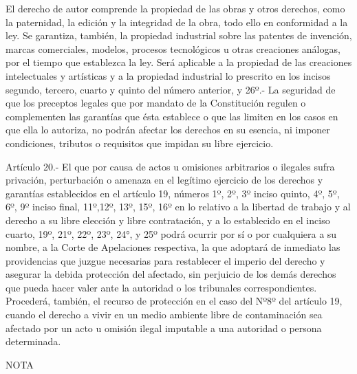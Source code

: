     El derecho de autor comprende la propiedad de las obras y otros derechos, como la paternidad, la edición y la integridad de la obra, todo ello en conformidad a la ley.
    Se garantiza, también, la propiedad industrial sobre las patentes de invención, marcas comerciales, modelos, procesos tecnológicos u otras creaciones análogas, por el tiempo que establezca la ley.
    Será aplicable a la propiedad de las creaciones intelectuales y artísticas y a la propiedad industrial lo prescrito en los incisos segundo, tercero, cuarto y quinto del número anterior, y
    26º.- La seguridad de que los preceptos legales que por mandato de la Constitución regulen o complementen las garantías que ésta establece o que las limiten en los casos en que ella lo autoriza, no podrán afectar los derechos en su esencia, ni imponer condiciones, tributos o requisitos que impidan su libre ejercicio.





    Artículo 20.- El que por causa de actos u omisiones arbitrarios o ilegales sufra privación, perturbación o amenaza en el legítimo ejercicio de los derechos y garantías establecidos en el artículo 19, números 1º, 2º, 3º inciso quinto, 4º, 5º, 6º, 9º inciso final, 11º,12º, 13º, 15º, 16º en lo relativo a la libertad de trabajo y al derecho a su libre elección y libre contratación, y a lo establecido en el inciso cuarto, 19º, 21º, 22º, 23º, 24°, y 25º podrá ocurrir por sí o por cualquiera a su nombre, a la Corte de Apelaciones respectiva, la que adoptará de inmediato las providencias que juzgue necesarias para restablecer el imperio del derecho y asegurar la debida protección del afectado, sin perjuicio de los demás derechos que pueda hacer valer ante la autoridad o los tribunales correspondientes.
    Procederá, también, el recurso de protección en el caso del Nº8º del artículo 19, cuando el derecho a vivir en un medio ambiente libre de contaminación sea afectado por un acto u omisión ilegal imputable a una autoridad o persona determinada.





NOTA


